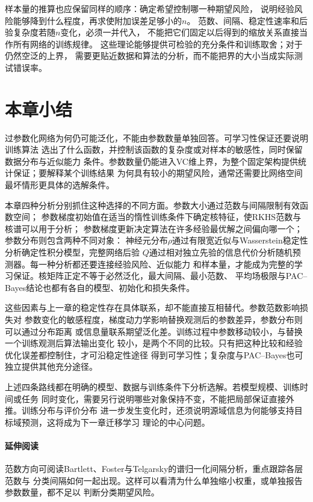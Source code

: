 样本量的推算也应保留同样的顺序：确定希望控制哪一种期望风险，
说明经验风险能够降到什么程度，再求使附加误差足够小的$n$。
范数、间隔、稳定性速率和后验复杂度若随$n$变化，必须一并代入，
不能把它们固定以后得到的缩放关系直接当作所有网络的训练规律。
这些理论能够提供可检验的充分条件和训练取舍；对于仍然空泛的上界，
需要更贴近数据和算法的分析，而不能把界的大小当成实际测试错误率。

\FloatBarrier
{}
\section{本章小结}
\label{sec:deep-learning-summary}

过参数化网络为何仍可能泛化，不能由参数数量单独回答。可学习性保证还要说明训练算法
选出了什么函数，并控制该函数的复杂度或对样本的敏感性，同时保留数据分布与近似能力
条件。参数数量仍能进入VC维上界，为整个固定架构提供统计保证；要解释某个训练结果
为何具有较小的期望风险，通常还需要比网络空间最坏情形更具体的选解条件。

本章四种分析分别抓住这种选择的不同方面。参数大小通过范数与间隔限制有效函数空间；
参数梯度初始值在适当的惰性训练条件下确定核特征，使RKHS范数与核谱可以用于分析；
参数梯度更新决定算法在许多经验最优解之间偏向哪一个；参数分布则包含两种不同对象：
神经元分布$\rho$通过有限宽近似与Wasserstein稳定性分析确定性积分模型，完整网络后验
$Q$通过相对独立先验的信息代价分析随机预测器。每一种分析都还要连接经验风险、近似能力
和样本量，才能成为完整的学习保证。核矩阵正定不等于必然泛化，最大间隔、最小范数、
平均场极限与PAC--Bayes结论也都有各自的模型、初始化和损失条件。

这些因素与上一章的稳定性存在具体联系，却不能直接互相替代。参数范数影响损失对
参数变化的敏感程度，梯度动力学影响替换观测后的参数差异，参数分布则可以通过分布距离
或信息量联系期望泛化差。训练过程中参数移动较小，与替换一个训练观测后算法输出变化
较小，是两个不同的比较。只有把这种比较和经验优化误差都控制住，才可沿稳定性途径
得到可学习性；复杂度与PAC--Bayes也可独立提供其他充分途径。

上述四条路线都在明确的模型、数据与训练条件下分析选解。若模型规模、训练时间或任务
同时变化，需要另行说明哪些对象保持不变，不能把局部保证直接外推。训练分布与评价分布
进一步发生变化时，还须说明源域信息为何能够支持目标域预测，这将成为下一章迁移学习
理论的中心问题。

\paragraph{延伸阅读}
范数方向可阅读Bartlett、Foster与Telgarsky的谱归一化间隔分析，重点跟踪各层范数与
分类间隔如何一起出现。这样可以看清为什么单独缩小权重，或单独报告参数数量，都不足以
判断分类期望风险。

